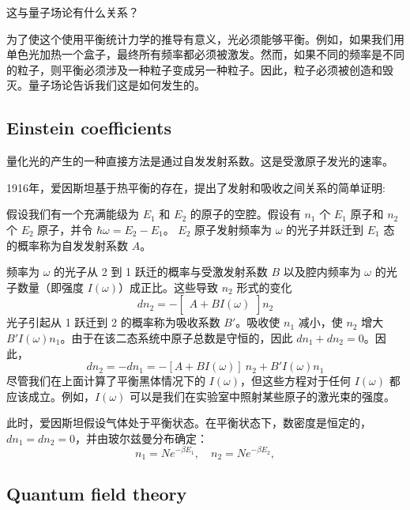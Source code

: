 \documentclass[14pt,a4paper,oneside]{article}
\numberwithin{equation}{section}             %
\numberwithin{figure}{section}               %
\begin{document}
这与量子场论有什么关系？

为了使这个使用平衡统计力学的推导有意义，光必须能够平衡。例如，如果我们用单色光加热一个盒子，最终所有频率都必须被激发。然而，如果不同的频率是不同的粒子，则平衡必须涉及一种粒子变成另一种粒子。因此，粒子必须被创造和毁灭。量子场论告诉我们这是如何发生的。

\subsection{Einstein coefficients}

量化光的产生的一种直接方法是通过自发发射系数。这是受激原子发光的速率。

1916年，爱因斯坦基于热平衡的存在，提出了发射和吸收之间关系的简单证明:

假设我们有一个充满能级为 $E_1$ 和 $E_2$ 的原子的空腔。假设有 $n_1$ 个 $E_1$ 原子和 $n_2$ 个 $E_2$ 原子，并令 $\hbar \omega = E_2 - E_1$。 $E_2$ 原子发射频率为 $\omega$ 的光子并跃迁到 $E_1$ 态的概率称为自发发射系数 $A$。

频率为 $\omega $ 的光子从 2 到 1 跃迁的概率与受激发射系数 $B$ 以及腔内频率为 $\omega$ 的光子数量（即强度 $I(\omega)$）成正比。这些导致 $n_2$ 形式的变化
\begin{equation}
    dn_2=-\begin{bmatrix}A+BI(\omega)\end{bmatrix}n_2
    \label{eq:1.8}
\end{equation}
光子引起从 1 跃迁到 2 的概率称为吸收系数 $B'$。吸收使 $n_1$ 减小，使 $n_2$ 增大 $B′I(\omega)n_1$。由于在该二态系统中原子总数是守恒的，因此 $dn_1 + dn_2 = 0$。因此，
\begin{equation}
    dn_2=-dn_1=-[A+BI(\omega)]\:n_2+B'I(\omega)n_1
    \label{eq:1.9}
\end{equation}
尽管我们在上面计算了平衡黑体情况下的 $I(\omega )$，但这些方程对于任何 $I(\omega )$ 都应该成立。例如，$I(\omega )$ 可以是我们在实验室中照射某些原子的激光束的强度。

此时，爱因斯坦假设气体处于平衡状态。在平衡状态下，数密度是恒定的，$dn_1 = dn_2 = 0$，并由玻尔兹曼分布确定：
\begin{equation}
    n_1=Ne^{-\beta E_1},\quad n_2=Ne^{-\beta E_2},
    \label{eq:1.10}
\end{equation}



\subsection{Quantum field theory}
\end{document}
